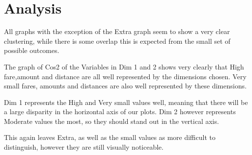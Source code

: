 \documentclass{article}
\begin{document}
\section{Analysis}
All graphs with the exception of the Extra graph seem to show a very clear clustering, while there is some overlap this is expected from the small set of possible outcomes.

The graph of Cos2 of the Variables in Dim 1 and 2 shows very clearly that High fare,amount and distance are all well represented by the dimensions chosen. Very small fares, amounts and distances are also well represented by these dimensions.

Dim 1 represents the High and Very small values well, meaning that there will be a large disparity in the horizontal axis of our plots. Dim 2 however represents Moderate values the most, so they should stand out in the vertical axis.

This again leaves Extra, as well as the small values as more difficult to distinguish, however they are still visually noticeable.
\end{document}
